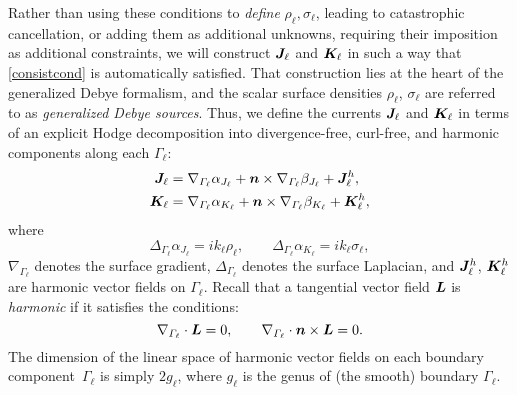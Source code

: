 \documentclass[11pt]{article}
\newcommand{\vct}{\vectorsym}
\newcommand{\surfdivl}{\nabla_{\Gamma_\ell} \cdot}
\newcommand{\surfgradl}{\nabla_{\Gamma_\ell}}
\newcommand{\surflapl}{\Delta_{\Gamma_\ell}}
\newcommand{\bL}{\vct{ L}}
\newcommand{\bJ}{\vct{ J}}
\newcommand{\bK}{\vct{ K}}
\newcommand\nhat{\vct{ {n}}}
\newcommand\bEtot{\vct{E}^\textnormal{tot}}
\newcommand\bHtot{\vct{H}^\textnormal{tot}}
\numberwithin{equation}{section}
\begin{document}
Rather than using these conditions to \emph{define} 
$\rho_\ell, \sigma_\ell$, leading to catastrophic cancellation,
or adding them as additional unknowns, requiring their imposition as
additional constraints, we will construct $\bJ_\ell$ and $\bK_\ell$
in such a way that \eqref{consistcond} is automatically satisfied.
That construction lies at the heart of the generalized Debye formalism,
and the scalar surface densities $\rho_\ell$, $\sigma_\ell$ are referred
to as \emph{generalized Debye sources}. 
%
Thus, we define the currents $\bJ_\ell$ and $\bK_\ell$ in terms of 
an explicit Hodge decomposition into
divergence-free, curl-free, and harmonic components
along each $\Gamma_\ell$:
\begin{equation}\label{eq_hodge}
  \begin{aligned}
    \bJ_\ell &= \surfgradl \alpha_{J_\ell} + \nhat \times \surfgradl
        \beta_{J_\ell} + \bJ^h_\ell, \\
    \bK_\ell &= \surfgradl \alpha_{K_\ell} + \nhat \times \surfgradl \beta_{K_\ell} + \bK^h_\ell,
  \end{aligned}
\end{equation}
where 
\begin{equation}\label{surflapeq}
\surflapl \alpha_{J_\ell} = ik_\ell \rho_\ell, \qquad 
\surflapl \alpha_{K_\ell} = ik_\ell \sigma_\ell,
\end{equation}
$\surfgradl$ denotes the surface gradient,
$\surflapl$ denotes the surface Laplacian, 
and $\bJ^h_\ell$, $\bK^h_\ell$ are harmonic vector fields on $\Gamma_\ell$.
Recall that a tangential vector field $\bL$ is {\em harmonic} if it satisfies 
the conditions:
\begin{equation}
\surfdivl \bL = 0, \qquad \surfdivl \nhat \times \bL = 0.
\end{equation}
The dimension of the linear space of harmonic vector fields on each
boundary component~$\Gamma_\ell$ is simply $2g_\ell$,
where $g_\ell$ is the genus of (the smooth) boundary $\Gamma_\ell$.
\end{document}
